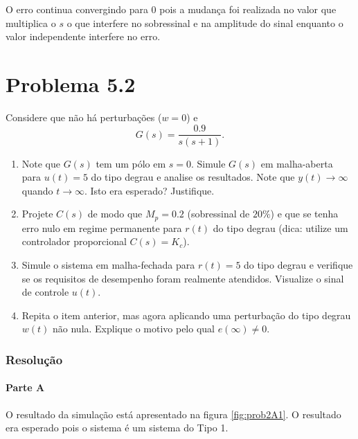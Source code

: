 \documentclass[
]{book}
\providecommand{\tightlist}{%
  \setlength{\itemsep}{0pt}\setlength{\parskip}{0pt}}
\theoremstyle{definition}
\theoremstyle{definition}
\theoremstyle{definition}
\theoremstyle{remark}
\begin{document}
O erro continua convergindo para 0 pois a mudança foi realizada no valor que multiplica o \(s\) o que interfere no sobressinal e na amplitude do sinal enquanto o valor independente interfere no erro.

\hypertarget{problema-5.2}{%
\section*{Problema 5.2}\label{problema-5.2}}

Considere que não há perturbações (\(w=0\)) e
\[
G(s) = \frac{0.9}{s(s+1)}.
\]

\begin{enumerate}
\def\labelenumi{(\alph{enumi})}
\tightlist
\item
  Note que \(G(s)\) tem um pólo em \(s=0\). Simule \(G(s)\) em malha-aberta para \(u(t) = 5\) do tipo degrau e analise os resultados. Note que \(y(t) \to \infty\) quando \(t \to \infty\). Isto era esperado? Justifique.
\item
  Projete \(C(s)\) de modo que \(M_p = 0.2\) (sobressinal de \(20\%\)) e que se tenha erro nulo em regime permanente para \(r(t)\) do tipo degrau (dica: utilize um controlador proporcional \(C(s) = K_c\)).
\item
  Simule o sistema em malha-fechada para \(r(t) = 5\) do tipo degrau e verifique se os requisitos de desempenho foram realmente atendidos. Visualize o sinal de controle \(u(t)\).
\item
  Repita o item anterior, mas agora aplicando uma perturbação do tipo degrau \(w(t)\) não nula. Explique o motivo pelo qual \(e(\infty) \neq 0\).
\end{enumerate}

\hypertarget{resoluuxe7uxe3o-13}{%
\subsubsection*{Resolução}\label{resoluuxe7uxe3o-13}}

\hypertarget{parte-a-6}{%
\paragraph{Parte A}\label{parte-a-6}}

O resultado da simulação está apresentado na figura \ref{fig:prob2A1}. O resultado era esperado pois o sistema é um sistema do Tipo 1.
\end{document}
